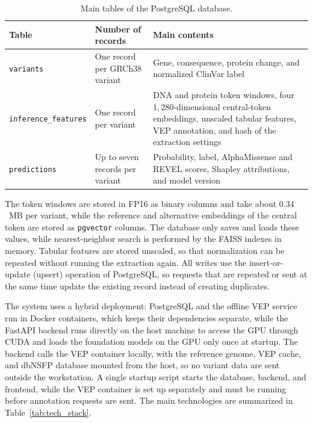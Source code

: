 \begin{table}[htbp]
    \centering
    \caption{Main tables of the PostgreSQL database.}
    \label{tab:db_schema}
    \begin{tabular}{lp{}p{}}
        \toprule
        \textbf{Table} & \textbf{Number of records} & \textbf{Main contents} \\
        \midrule
        \texttt{variants} & One record per GRCh38 variant & Gene, consequence, protein change, and normalized ClinVar label \\
        \addlinespace
        \texttt{inference\_features} & One record per variant & DNA and protein token windows, four $1{,}280$-dimensional central-token embeddings, unscaled tabular features, VEP annotation, and hash of the extraction settings \\
        \addlinespace
        \texttt{predictions} & Up to seven records per variant & Probability, label, AlphaMissense and REVEL scores, Shapley attributions, and model version \\
        \bottomrule
    \end{tabular}
\end{table}

The token windows are stored in FP16 as binary columns and take about $0.34$~MB per variant, while the reference and alternative embeddings of the central token are stored as \texttt{pgvector} columns. The database only saves and loads these values, while nearest-neighbor search is performed by the FAISS indexes in memory. Tabular features are stored unscaled, so that normalization can be repeated without running the extraction again. All writes use the insert-or-update (upsert) operation of PostgreSQL, so requests that are repeated or sent at the same time update the existing record instead of creating duplicates.

The system uses a hybrid deployment: PostgreSQL and the offline VEP service run in Docker containers, which keeps their dependencies separate, while the FastAPI backend runs directly on the host machine to access the GPU through CUDA and loads the foundation models on the GPU only once at startup. The backend calls the VEP container locally, with the reference genome, VEP cache, and dbNSFP database mounted from the host, so no variant data are sent outside the workstation. A single startup script starts the database, backend, and frontend, while the VEP container is set up separately and must be running before annotation requests are sent. The main technologies are summarized in Table~\ref{tab:tech_stack}.

